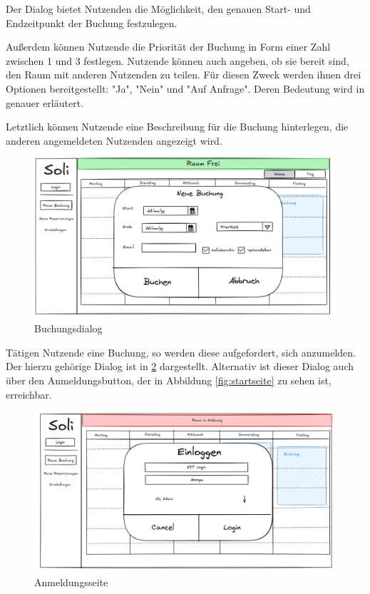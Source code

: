 Der Dialog bietet Nutzenden die Möglichkeit, den genauen Start- und Endzeitpunkt der Buchung festzulegen.

Außerdem können Nutzende die Priorität der Buchung in Form einer Zahl zwischen 1 und 3 festlegen.
Nutzende können auch angeben, ob sie bereit sind, den Raum mit anderen Nutzenden zu teilen.
Für diesen Zweck werden ihnen drei Optionen bereitgestellt: "Ja", "Nein" und "Auf Anfrage".
Deren Bedeutung wird in  genauer erläutert.

Letztlich können Nutzende eine Beschreibung für die Buchung hinterlegen, die anderen angemeldeten Nutzenden angezeigt wird.
\begin{figure}[ht]
    \centering
    \includegraphics[scale=0.15]{figures/ui/buchungsdialog}
    \caption{Buchungsdialog}
    \label{fig:buchung}
\end{figure}
\clearpage

Tätigen Nutzende eine Buchung, so werden diese aufgefordert, sich anzumelden.
Der hierzu gehörige Dialog ist in \ref{fig:login} dargestellt.
Alternativ ist dieser Dialog auch über den Anmeldungsbutton, der in Abbildung \ref{fig:startseite} zu sehen ist, erreichbar.
\begin{figure}[ht]
    \centering
    \includegraphics[scale=0.15]{figures/ui/anmeldungsseite}
    \caption{Anmeldungsseite}
    \label{fig:login}
\end{figure}
\clearpage

